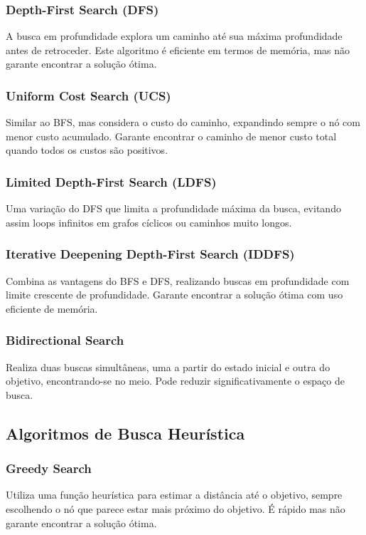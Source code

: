 \documentclass[12pt,a4paper]{article}
\begin{document}
\subsubsection{Depth-First Search (DFS)}
A busca em profundidade explora um caminho até sua máxima profundidade antes de retroceder. Este algoritmo é eficiente em termos de memória, mas não garante encontrar a solução ótima.

\subsubsection{Uniform Cost Search (UCS)}
Similar ao BFS, mas considera o custo do caminho, expandindo sempre o nó com menor custo acumulado. Garante encontrar o caminho de menor custo total quando todos os custos são positivos.

\subsubsection{Limited Depth-First Search (LDFS)}
Uma variação do DFS que limita a profundidade máxima da busca, evitando assim loops infinitos em grafos cíclicos ou caminhos muito longos.

\subsubsection{Iterative Deepening Depth-First Search (IDDFS)}
Combina as vantagens do BFS e DFS, realizando buscas em profundidade com limite crescente de profundidade. Garante encontrar a solução ótima com uso eficiente de memória.

\subsubsection{Bidirectional Search}
Realiza duas buscas simultâneas, uma a partir do estado inicial e outra do objetivo, encontrando-se no meio. Pode reduzir significativamente o espaço de busca.

\subsection{Algoritmos de Busca Heurística}

\subsubsection{Greedy Search}
Utiliza uma função heurística para estimar a distância até o objetivo, sempre escolhendo o nó que parece estar mais próximo do objetivo. É rápido mas não garante encontrar a solução ótima.
\end{document}

